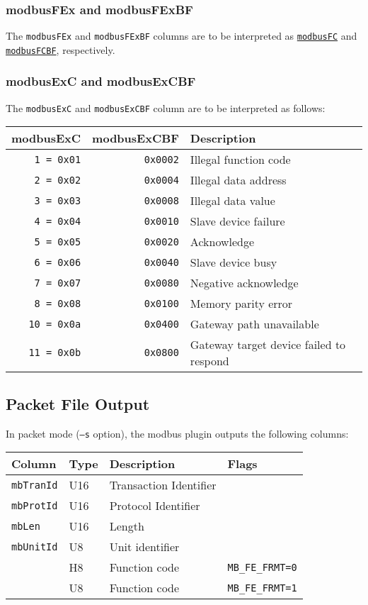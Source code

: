 \documentclass[documentation]{subfiles}
\begin{document}
\subsubsection{modbusFEx and modbusFExBF}\label{modbusFEx}
The {\tt modbusFEx} and {\tt modbusFExBF} columns are to be interpreted as {\tt\hyperref[modbusFC]{modbusFC}} and {\tt\hyperref[modbusFC]{modbusFCBF}}, respectively.

\subsubsection{modbusExC and modbusExCBF}\label{modbusExC}
The {\tt modbusExC} and {\tt modbusExCBF} column are to be interpreted as follows:
\begin{longtable}{rrl}
    \toprule
    {\bf modbusExC} & {\bf modbusExCBF} & {\bf Description}\\
    \midrule\endhead%
    {\tt  1 = 0x01} & {\tt 0x0002} & Illegal function code\\
    {\tt  2 = 0x02} & {\tt 0x0004} & Illegal data address\\
    {\tt  3 = 0x03} & {\tt 0x0008} & Illegal data value\\
    {\tt  4 = 0x04} & {\tt 0x0010} & Slave device failure\\
    {\tt  5 = 0x05} & {\tt 0x0020} & Acknowledge\\
    {\tt  6 = 0x06} & {\tt 0x0040} & Slave device busy\\
    {\tt  7 = 0x07} & {\tt 0x0080} & Negative acknowledge\\
    {\tt  8 = 0x08} & {\tt 0x0100} & Memory parity error\\
    {\tt 10 = 0x0a} & {\tt 0x0400} & Gateway path unavailable\\
    {\tt 11 = 0x0b} & {\tt 0x0800} & Gateway target device failed to respond\\
    \bottomrule
\end{longtable}

\subsection{Packet File Output}
In packet mode ({\tt --s} option), the modbus plugin outputs the following columns:
\begin{longtable}{llll}
    \toprule
    {\bf Column} & {\bf Type} & {\bf Description} & {\bf Flags}\\
    \midrule\endhead%
    {\tt mbTranId} & U16 & Transaction Identifier\\
    {\tt mbProtId} & U16 & Protocol Identifier\\
    {\tt mbLen}    & U16 & Length\\
    {\tt mbUnitId} & U8 & Unit identifier\\
    {\tt \nameref{mbFuncCode}} & H8 & Function code & {\tt MB\_FE\_FRMT=0}\\
    {\tt \nameref{mbFuncCode}} & U8 & Function code & {\tt MB\_FE\_FRMT=1}\\
    \bottomrule
\end{longtable}
\end{document}
